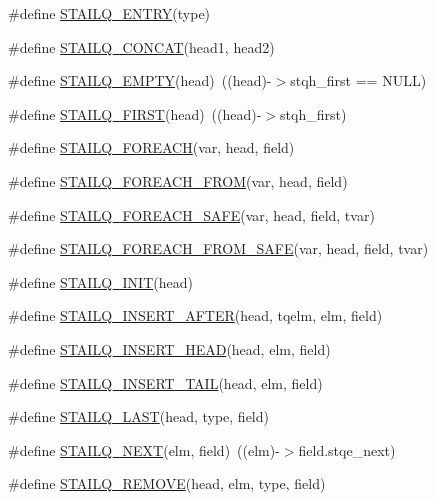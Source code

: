 \begin{DoxyCompactItemize}
\#define \hyperlink{queue_8h_a765904f4fab4e7de1e2cd8ff351bc353}{S\-T\-A\-I\-L\-Q\-\_\-\-E\-N\-T\-R\-Y}(type)
\item 
\#define \hyperlink{queue_8h_aadfbe79db37e93cf528ae79a9aafb755}{S\-T\-A\-I\-L\-Q\-\_\-\-C\-O\-N\-C\-A\-T}(head1, head2)
\item 
\#define \hyperlink{queue_8h_a8427c8f43d09d73062cf6b37f303aff5}{S\-T\-A\-I\-L\-Q\-\_\-\-E\-M\-P\-T\-Y}(head)~((head)-\/$>$stqh\-\_\-first == N\-U\-L\-L)
\item 
\#define \hyperlink{queue_8h_a3e2eb7535019a2829399b24744dd1a66}{S\-T\-A\-I\-L\-Q\-\_\-\-F\-I\-R\-S\-T}(head)~((head)-\/$>$stqh\-\_\-first)
\item 
\#define \hyperlink{queue_8h_a77999ebdf5aaf7af8b8ea22bf208c432}{S\-T\-A\-I\-L\-Q\-\_\-\-F\-O\-R\-E\-A\-C\-H}(var, head, field)
\item 
\#define \hyperlink{queue_8h_afc90cddaa7d2b43eb0ca0588b09e493a}{S\-T\-A\-I\-L\-Q\-\_\-\-F\-O\-R\-E\-A\-C\-H\-\_\-\-F\-R\-O\-M}(var, head, field)
\item 
\#define \hyperlink{queue_8h_ac3203dcce73148c142df4586eb55ce55}{S\-T\-A\-I\-L\-Q\-\_\-\-F\-O\-R\-E\-A\-C\-H\-\_\-\-S\-A\-F\-E}(var, head, field, tvar)
\item 
\#define \hyperlink{queue_8h_a7c6e582a011a3935507475e8a952b4bd}{S\-T\-A\-I\-L\-Q\-\_\-\-F\-O\-R\-E\-A\-C\-H\-\_\-\-F\-R\-O\-M\-\_\-\-S\-A\-F\-E}(var, head, field, tvar)
\item 
\#define \hyperlink{queue_8h_a3b508a1c06ded6b4ce4b1feea7643c28}{S\-T\-A\-I\-L\-Q\-\_\-\-I\-N\-I\-T}(head)
\item 
\#define \hyperlink{queue_8h_af6ebdaf4ccbde5e464273b8079e832b3}{S\-T\-A\-I\-L\-Q\-\_\-\-I\-N\-S\-E\-R\-T\-\_\-\-A\-F\-T\-E\-R}(head, tqelm, elm, field)
\item 
\#define \hyperlink{queue_8h_aad3b1fb87b675bae75334acd958b57dc}{S\-T\-A\-I\-L\-Q\-\_\-\-I\-N\-S\-E\-R\-T\-\_\-\-H\-E\-A\-D}(head, elm, field)
\item 
\#define \hyperlink{queue_8h_a7bc9a31418b55c5698be3e54e10bb484}{S\-T\-A\-I\-L\-Q\-\_\-\-I\-N\-S\-E\-R\-T\-\_\-\-T\-A\-I\-L}(head, elm, field)
\item 
\#define \hyperlink{queue_8h_ae18d422917aa0b8efb0f58d92a19ae41}{S\-T\-A\-I\-L\-Q\-\_\-\-L\-A\-S\-T}(head, type, field)
\item 
\#define \hyperlink{queue_8h_ad89ac472696d006112dface9c2d75e47}{S\-T\-A\-I\-L\-Q\-\_\-\-N\-E\-X\-T}(elm, field)~((elm)-\/$>$field.\-stqe\-\_\-next)
\item 
\#define \hyperlink{queue_8h_a2a0d6665f277f80bf301a16e6ab2403c}{S\-T\-A\-I\-L\-Q\-\_\-\-R\-E\-M\-O\-V\-E}(head, elm, type, field)

\end{DoxyCompactItemize}
